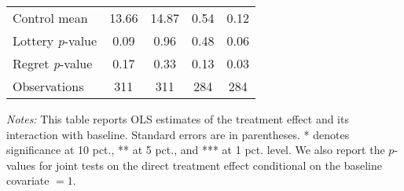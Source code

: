 \begin{table}[ht]
{\begin{threeparttable}
\begin{tabular}{l*{4}{c}}
Control mean    &    13.66         &    14.87         &     0.54         &     0.12         \\
Lottery \emph{p}-value&     0.09         &     0.96         &     0.48         &     0.06         \\
Regret \emph{p}-value&     0.17         &     0.33         &     0.13         &     0.03         \\
Observations    &      311         &      311         &      284         &      284         \\
\bottomrule \end{tabular} \begin{tablenotes}[flushleft] \footnotesize \item \emph{Notes:} This table reports OLS estimates of the treatment effect and its interaction with baseline. Standard errors are in parentheses. * denotes significance at 10 pct., ** at 5 pct., and *** at 1 pct. level. We also report the \(p\)-values for joint tests on the direct treatment effect conditional on the baseline covariate $= 1$. \end{tablenotes} \end{threeparttable} } \end{table}

